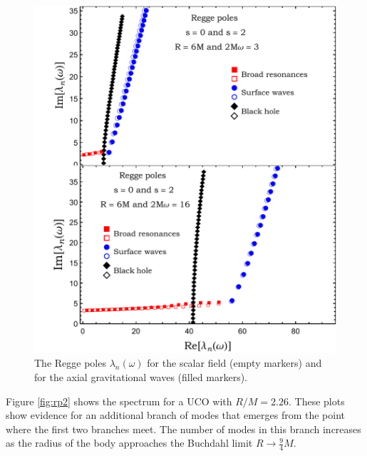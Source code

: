 \documentclass[aps,prd,longbibliography,reprint,twocolumn,amsmath,amssymb,amsfonts,showpacs,superscriptaddress]{revtex4-1}%
\begin{document}
\begin{figure}[htb]
\centering
 \includegraphics[scale=0.50]{RP_R_6_2Mw_3_16_s_0_s_2}
\caption{\label{RP_approx_2Mw_3_6_s_1} The Regge poles $\lambda_n(\omega)$ for the scalar field (empty markers) and for the axial gravitational waves (filled markers). %
}
\label{fig:rp1}
\end{figure}

Figure \ref{fig:rp2} shows the spectrum for a UCO with $R/M = 2.26$. These plots show evidence for an additional branch of modes that emerges from the point where the first two branches meet. The number of modes in this branch increases as the radius of the body approaches the Buchdahl limit $R \rightarrow \tfrac{9}{4}M$. 
\end{document}
